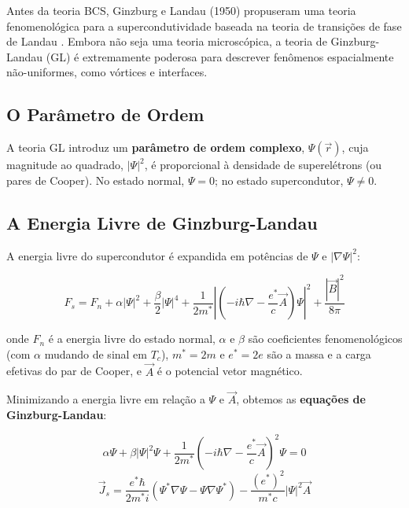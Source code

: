 \documentclass[12pt, a4paper, oneside]{report}
\begin{document}
Antes da teoria BCS, Ginzburg e Landau (1950) propuseram uma teoria fenomenológica para a supercondutividade baseada na teoria de transições de fase de Landau \cite{ginzburg1950}. Embora não seja uma teoria microscópica, a teoria de Ginzburg-Landau (GL) é extremamente poderosa para descrever fenômenos espacialmente não-uniformes, como vórtices e interfaces.

\subsection{O Parâmetro de Ordem}

A teoria GL introduz um \textbf{parâmetro de ordem complexo}, $\Psi(\vec{r})$, cuja magnitude ao quadrado, $|\Psi|^2$, é proporcional à densidade de superelétrons (ou pares de Cooper). No estado normal, $\Psi = 0$; no estado supercondutor, $\Psi \neq 0$.

\subsection{A Energia Livre de Ginzburg-Landau}

A energia livre do supercondutor é expandida em potências de $\Psi$ e $|\nabla \Psi|^2$:

\begin{equation}
    F_s = F_n + \alpha |\Psi|^2 + \frac{\beta}{2} |\Psi|^4 + \frac{1}{2m^*} \left| \left( -i\hbar \nabla - \frac{e^*}{c} \vec{A} \right) \Psi \right|^2 + \frac{|\vec{B}|^2}{8\pi}
\end{equation}

onde $F_n$ é a energia livre do estado normal, $\alpha$ e $\beta$ são coeficientes fenomenológicos (com $\alpha$ mudando de sinal em $T_c$), $m^* = 2m$ e $e^* = 2e$ são a massa e a carga efetivas do par de Cooper, e $\vec{A}$ é o potencial vetor magnético.

Minimizando a energia livre em relação a $\Psi$ e $\vec{A}$, obtemos as \textbf{equações de Ginzburg-Landau}:

\begin{equation}
    \alpha \Psi + \beta |\Psi|^2 \Psi + \frac{1}{2m^*} \left( -i\hbar \nabla - \frac{e^*}{c} \vec{A} \right)^2 \Psi = 0
\end{equation}
\begin{equation}
    \vec{J}_s = \frac{e^* \hbar}{2m^* i} (\Psi^* \nabla \Psi - \Psi \nabla \Psi^*) - \frac{(e^*)^2}{m^* c} |\Psi|^2 \vec{A}
\end{equation}
\end{document}
